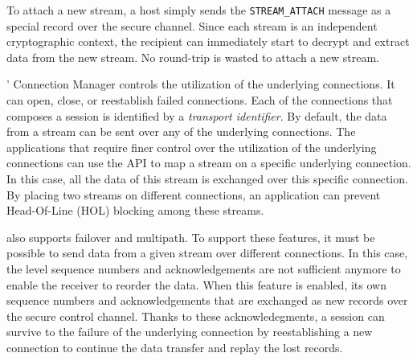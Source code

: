 To attach a new stream, a host simply sends the \texttt{STREAM\_ATTACH} message as a special \tls record over the secure channel. Since each stream is an independent cryptographic context, the recipient can immediately start to decrypt and extract data from the new stream. No round-trip is wasted to attach a new stream.




\tcpls' Connection Manager controls the utilization of the underlying \tcp connections. It can open, close, or reestablish failed \tcp connections. Each of
the connections that composes a \tcpls session is identified by a \emph{transport identifier}. By default, the data from a stream can be sent over any of the underlying \tcp connections. The applications that require finer control over the utilization of the underlying \tcp connections can use the \tcpls API to map a stream on a specific underlying connection. In this case, all the data of this stream is exchanged over this specific connection. By placing two streams on different connections, an application can prevent Head-Of-Line (HOL) blocking among these streams.

\tcpls also supports failover and multipath. To support these features, it
must be possible to send data from a given stream over different \tcp connections. In this case, the \tcp level sequence numbers and acknowledgements are not sufficient anymore to enable the receiver to reorder the data. When this feature
is enabled, \tcpls its own sequence numbers and acknowledgements that are exchanged as new \tls records over the secure control channel.
Thanks to these \tcpls acknowledegments, a \tcpls session can survive to
the failure of the underlying \tcp connection by reestablishing a new
\tcp connection to continue the data transfer and replay the lost records.

